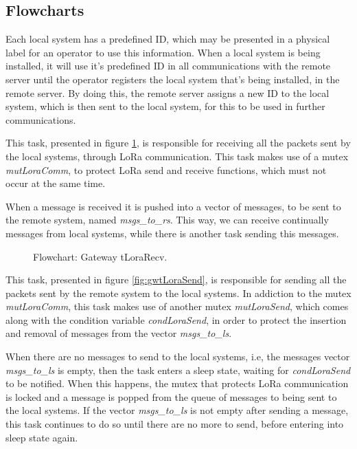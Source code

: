 

\subsection{Flowcharts}
Each local system has a predefined ID, which may be presented in a physical label for an operator to use this information. When a local system is being installed, it will use it's predefined ID in all communications with the remote server until the operator registers the local system that's being installed, in the remote server. By doing this, the remote server assigns a new ID to the local system, which is then sent to the local system, for this to be used in further communications.

This task, presented in figure \ref{fig:gwtLoraRecv}, is responsible for receiving all the packets sent by the local systems, through LoRa communication. This task makes use of a mutex \textit{mutLoraComm}, to protect LoRa send and receive functions, which must not occur at the same time.

When a message is received it is pushed into a vector of messages, to be sent to the remote system, named \textit{msgs\_to\_rs}. This way, we can receive continually messages from local systems, while there is another task sending this messages.

\begin{figure}[H]
	\centering
	\caption{Flowchart: Gateway tLoraRecv.}
	\label{fig:gwtLoraRecv}
\end{figure}

This task, presented in figure \ref{fig:gwtLoraSend}, is responsible for sending all the packets sent by the remote system to the local systems. In addiction to the mutex \textit{mutLoraComm}, this task makes use of another mutex \textit{mutLoraSend}, which comes along with the condition variable \textit{condLoraSend}, in order to protect the insertion and removal of messages from the vector \textit{msgs\_to\_ls}.

When there are no messages to send to the local systems, i.e, the messages vector \textit{msgs\_to\_ls} is empty, then the task enters a sleep state, waiting for \textit{condLoraSend} to be notified. When this happens, the mutex that protects LoRa communication is locked and a message is popped from the queue of messages to being sent to the local systems. If the vector \textit{msgs\_to\_ls} is not empty after sending a message, this task continues to do so until there are no more to send, before entering into sleep state again.

